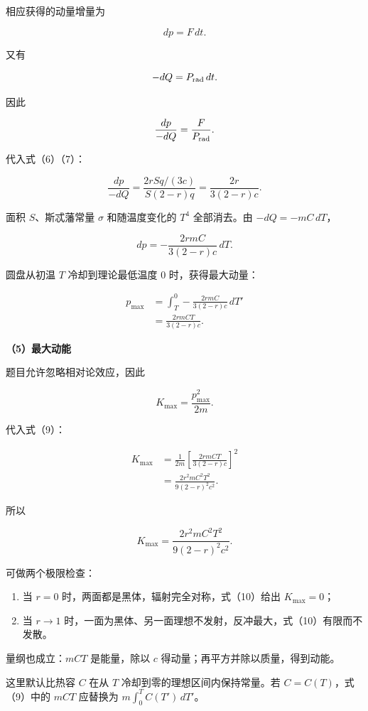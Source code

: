 \documentclass[12pt,a4paper,UTF8]{ctexart}
\newcommand{\tightlist}{\setlength{\itemsep}{0pt}\setlength{\parskip}{0pt}}
\begin{document}
相应获得的动量增量为

\[
dp=F\,dt.
\]

又有

\[
-dQ=P_{\rm rad}\,dt.
\]

因此

\[
\frac{dp}{-dQ}=\frac{F}{P_{\rm rad}}.
\]

代入式（6）（7）：

\[
\frac{dp}{-dQ}
=\frac{2rSq/(3c)}{S(2-r)q}
=\frac{2r}{3(2-r)c}.
\tag{8}
\]

面积 \(S\)、斯忒藩常量 \(\sigma\) 和随温度变化的 \(T^4\) 全部消去。由
\(-dQ=-mC\,dT\)，

\[
dp=-\frac{2rmC}{3(2-r)c}\,dT.
\]

圆盘从初温 \(T\) 冷却到理论最低温度 \(0\) 时，获得最大动量：

\[
\begin{aligned}
p_{\max}
&=\int_T^0-\frac{2rmC}{3(2-r)c}\,dT'\\
&=\frac{2rmCT}{3(2-r)c}.
\end{aligned}
\tag{9}
\]

\textbf{（5）最大动能}

题目允许忽略相对论效应，因此

\[
K_{\max}=\frac{p_{\max}^2}{2m}.
\]

代入式（9）：

\[
\begin{aligned}
K_{\max}
&=\frac1{2m}
\left[\frac{2rmCT}{3(2-r)c}\right]^2\\
&=\frac{2r^2mC^2T^2}{9(2-r)^2c^2}.
\end{aligned}
\]

所以

\[
\boxed{
K_{\max}=\frac{2r^2mC^2T^2}{9(2-r)^2c^2}
}.
\tag{10}
\]

可做两个极限检查：

\begin{enumerate}
\def\labelenumi{\arabic{enumi}.}
\tightlist
\item
  当 \(r=0\) 时，两面都是黑体，辐射完全对称，式（10）给出
  \(K_{\max}=0\)；
\item
  当 \(r\to1\)
  时，一面为黑体、另一面理想不发射，反冲最大，式（10）有限而不发散。
\end{enumerate}

量纲也成立：\(mCT\) 是能量，除以 \(c\)
得动量；再平方并除以质量，得到动能。

这里默认比热容 \(C\) 在从 \(T\) 冷却到零的理想区间内保持常量。若
\(C=C(T)\)，式（9）中的 \(mCT\) 应替换为 \(m\int_0^TC(T')\,dT'\)。
\end{document}
